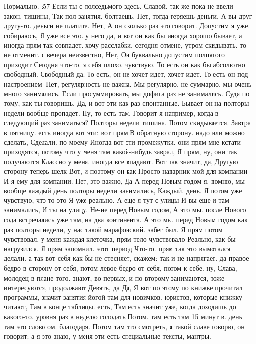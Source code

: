 \M
Нормально.
:57
Если
ты с полседьмого здесь.
Славой. так же пока не ввели закон.
тишины, Так пол занятия.
болтаешь. Нет, тогда теряешь деньги, А вы друг другу-то.
деньги не платите.
Нет, А он сколько раз это говорит. Допустим я уже.
собираюсь, Я уже все это.
у него да, и вот он как бы иногда хорошо бывает, а иногда прям так совпадет. хочу расслабки, сегодня отмене, утром скидывать.
то не отменит. с вечера неизвестно, Нет, Он буквально допустим полпятого приходит Сегодня что-то.
я себя плохо.
чувствую.
То есть он как бы абсолютно свободный.
Свободный да.
То есть, он не хочет идет, хочет идет.
То есть он под настроением.
Нет, регулярность не важна.
Мы регулярно, не суммарно. мы очень много занимались.
Если просуммировать, мы дофига раз не занимались.
Судя по тому, как ты говоришь.
Да, и вот эти как раз спонтанные.
Бывает он на полторы недели вообще пропадет.
Ну, то есть там.
Говорит я например, когда в следующий раз заниматься?
Полторы недели тишина.
Потом скидывается.
Завтра в пятницу.
есть иногда вот эти:
вот прям В обратную сторону. надо или можно сделать, Сделали.
по-моему Иногда вот эти промежутки.
они прям мне кстати приходятся, потому что у меня там какой-нибудь заврал, Я прям, ну, они так получаются Классно у меня.
иногда все впадают. Вот так значит, да, Другую сторону теперь шелк Вот, и поэтому он как Просто напарник мой для компании И я ему для компании.
Нет, это важно, Да А перед Новым годом я.
помню, мы вообще каждый день полторы недели занимались, Каждый.
день. Я потом уже чувствую, что-то это Я уже реально. А еще я тут с улицы И вы еще и там занимались, И ты на улицу.
Не-не перед Новым годом, А это мы. после Нового года встречались уже там, на два континента. А это мы.
перед Новым годом как раз полторы недели, у нас такой марафонский.
забег был. Я прям потом чувствовал, у меня каждая клеточка, прям тело чувствовало Реально, как бы нагрузился. Я прям запомнил.
этот период Что-то.
прям так это вымотался делали.
а так вот себя как бы не стесняет, скажем:
так и не напрягает. да правое бедро в сторону от себя, потом левое бедро от себя, потом к себе. ну, Слава, молодец в плане того.
знают, во-первых, и по-второму занимаются, тоже интересуются, продолжают Девять, да Да, Я вот по этому по книжке прочитал программы, значит занятия йогой там для новичков.
юристов, которые книжку читают, Там в конце таблицы.
есть, Там есть значит уже, когда доходишь до какого-то.
уровня раз в неделю голодать Потом.
там есть там 15 минут в.
день там это слово ом.
благодаря.
Потом там это смотреть, я такой славе говорю, он говорит: а я это знаю, у меня эти есть специальные тексты, мантры.
